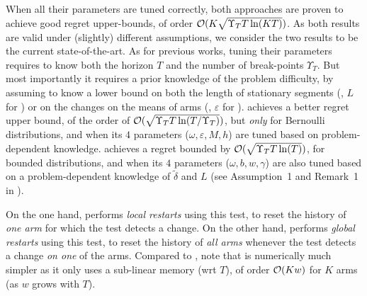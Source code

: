 When all their parameters are tuned correctly, both approaches are proven to achieve good regret upper-bounds, of order $\mathcal{O}(K \sqrt{\Upsilon_T T \ln(K T)})$.
As both results are valid under (slightly) different assumptions, we consider the two results to be the current state-of-the-art.
As for previous works, tuning their parameters requires to know both the horizon $T$ and the number of break-points $\Upsilon_T$.
But most importantly it requires a prior knowledge of the problem difficulty, by assuming to know a lower bound on both the length of stationary segments (\eg, $L$ for \MUCB) or on the changes on the means of arms (\eg, $\varepsilon$ for \CUSUM).
%
\CUSUMUCB{} achieves a better regret upper bound, of the order of $\mathcal{O}(\sqrt{\Upsilon_T T \ln(T / \Upsilon_T)})$, but \emph{only} for Bernoulli distributions,
and when its $4$ parameters ($\omega, \varepsilon, M, h$) are tuned based on problem-dependent knowledge.
%
\MUCB{} achieves a regret bounded by $\mathcal{O}(\sqrt{\Upsilon_T T \ln(T)})$, for bounded distributions, and when its $4$ parameters ($\omega, b, w, \gamma$) are also tuned based on a problem-dependent knowledge of $\tilde{\delta}$ and $L$ (see Assumption~1 and Remark~1 in \cite{CaoZhenKvetonXie18}).


On the one hand, \CUSUMUCB{} performs \emph{local restarts} using this test, to reset the history of \emph{one arm} for which the test detects a change.
On the other hand, \MUCB{} performs \emph{global restarts} using this test, to reset the history of \emph{all arms} whenever the test detects a change \emph{on one} of the arms.
Compared to \CUSUMUCB, note that \MUCB{} is numerically much simpler as it only uses a sub-linear memory (wrt $T$), of order $\mathop{}\mathopen{}\mathcal{O}\mathopen{}\left(K w\right)$ for $K$ arms (as $w$ grows with $T$).

